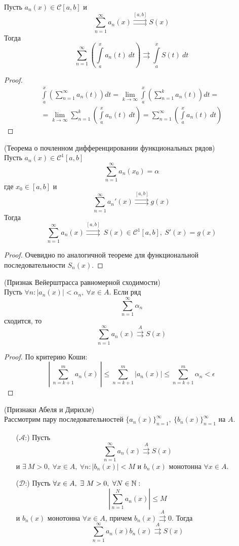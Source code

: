 \begin{theorem}
    Пусть $a_n(x)\in \mathcal{C}[a,b]$ и
    \[\sum_{n=1}^{\infty}a_n(x)\overset{[a,b]}{\rightrightarrows} S(x)\]
    Тогда 
    \[\sum_{n=1}^{\infty}\left(\int\limits_{a}^{x}a_n(t)\ dt\right)\rightrightarrows \int\limits_{a}^{x}S(t)\ dt\]
\end{theorem}
\begin{proof}
    \begin{multline*}
        \int\limits_{a}^{x}\left(\sum_{n=1}^{\infty}a_n(t)\right) dt=\lim\limits_{k\to \infty}\int\limits_{a}^{x}\left(\sum\limits_{n=1}^{k}a_n(t)\right)dt=\\
        =\lim\limits_{k\to \infty}\sum\limits_{n=1}^{k}\left(\int\limits_{a}^{x}a_n(t)\ dt\right)=\sum_{n=1}^{\infty}\left(\int\limits_{a}^{x}a_n(t)\ dt\right)
    \end{multline*}
\end{proof}
\begin{theorem} (Теорема о почленном дифференцировании функциональных рядов)\\
    Пусть $a_n(x)\in \mathcal{C}^1{[a,b]}$
    \[\sum_{n=1}^{\infty}a_n(x_0)=\alpha\]
    где $x_0\in [a,b]$ и 
    \[\sum_{n=1}^{\infty}a_n'(x)\overset{[a,b]}\rightrightarrows g(x)\]
    Тогда
    \[\sum_{n=1}^{\infty}a_n(x)\overset{[a,b]}{\rightrightarrows}\ S(x)\in \mathcal{C}^1[a,b],\ S'(x)=g(x)\]
\end{theorem}
\begin{proof}
    Очевидно по аналогичной теореме для функциональной последовательности $S_n(x)$.
\end{proof}
\begin{theorem} (Признак Вейерштрасса равномерной сходимости)\\
    Пусть $\forall n: |a_n(x)|<\alpha_n,\ \forall x\in A$. Если ряд
    \[\sum_{n=1}^{\infty}\alpha_n\]
    сходится, то
    \[\sum_{n=1}^{\infty}a_n(x)\overset{A}\rightrightarrows S(x)\]
\end{theorem}
\begin{proof} По критерию Коши:
    \[\left|\ \sum_{n=k+1}^{m}a_n(x)\ \right|\leq \sum_{n=k+1}^{m}|a_n(x)|\leq \sum_{n=k+1}^{m}\alpha_n<\epsilon\]
\end{proof}
\begin{theorem} (Признаки Абеля и Дирихле)\\
    Рассмотрим пару последовательностей $\{a_n(x)\}_{n=1}^{\infty},\ \{b_n(x)\}_{n=1}^{\infty}$ на $A$.
    \begin{itemize}
        \item[($\mathcal{A}$:)] Пусть 
        \[\sum_{n=1}^{\infty}a_n(x)\overset{A}\rightrightarrows S(x)\]
        и $\exists\ M>0,\ \forall x\in A,\ \forall n: |b_n(x)|<M$ и $b_n(x)$ монотонна $\forall x\in A$.
        \item[($\mathcal{D}$:)] Пусть $\forall x\in A,\ \exists\ M>0,\ \forall N\in \N:$ 
        \[\left|\sum_{n=1}^{N}a_n(x)\right|\leq M\]
        и $b_n(x)$ монотонна $\forall x\in A$, причем $b_n(x)\overset{A}\rightrightarrows 0$. Тогда 
        \[\sum_{n=1}^{\infty}a_n(x)b_n(x) \overset{A}\rightrightarrows S(x)\]
    \end{itemize}
\end{theorem}
